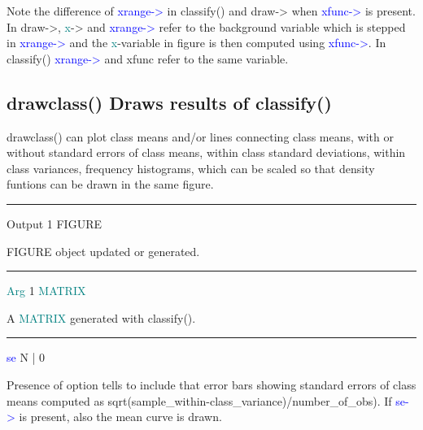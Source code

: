 \begin{note} 
Note the difference of \textcolor{blue}{xrange->} in \textcolor{VioletRed}{classify}() and draw-> when \textcolor{blue}{xfunc->} is present. 
In draw->, \textcolor{teal}{x}-> and \textcolor{blue}{xrange->} refer to the background variable which is stepped in \textcolor{blue}{xrange->} 
and the \textcolor{teal}{x}-variable in figure is then computed using \textcolor{blue}{xfunc->}. In \textcolor{VioletRed}{classify}() \textcolor{blue}{xrange->} and 
xfunc refer to the same variable. 
\end{note} 
\subsection{\textcolor{VioletRed}{drawclass}() Draws results of \textcolor{VioletRed}{classify}()} 
\label{drawclass} 
\textcolor{VioletRed}{drawclass}() can plot class means and/or lines connecting class means, with 
or without standard errors of class means, within class standard deviations, 
within class variances, frequency histograms, which can be scaled so that 
density funtions can be drawn in the same figure. 
\vspace{0.3cm} 
\hrule 
\vspace{0.3cm} 
\noindent Output  \tabto{3cm} 1  \tabto{5cm}   FIGURE  \tabto{7cm} 
\begin{changemargin}{3cm}{0cm} 
\noindent  FIGURE object updated or generated. 
\end{changemargin} 
\vspace{0.3cm} 
\hrule 
\vspace{0.3cm} 
\noindent \textcolor{teal}{Arg}  \tabto{3cm}  1 \tabto{5cm}   \textcolor{teal}{MATRIX}  \tabto{7cm} 
\begin{changemargin}{3cm}{0cm} 
\noindent  A \textcolor{teal}{MATRIX} generated with \textcolor{VioletRed}{classify}(). 
\end{changemargin} 
\vspace{0.3cm} 
\hrule 
\vspace{0.3cm} 
\noindent \textcolor{blue}{se}  \tabto{3cm}  N | 0  \tabto{5cm}    \tabto{7cm} 
\begin{changemargin}{3cm}{0cm} 
\noindent Presence of option tells to include that error bars showing standard errors 
of class means computed as \textcolor{VioletRed}{sqrt}(sample\_within-class\_variance)/number\_of\_obs). If \textcolor{blue}{se->} is present, 
also the mean curve is drawn. 
\end{changemargin} 
